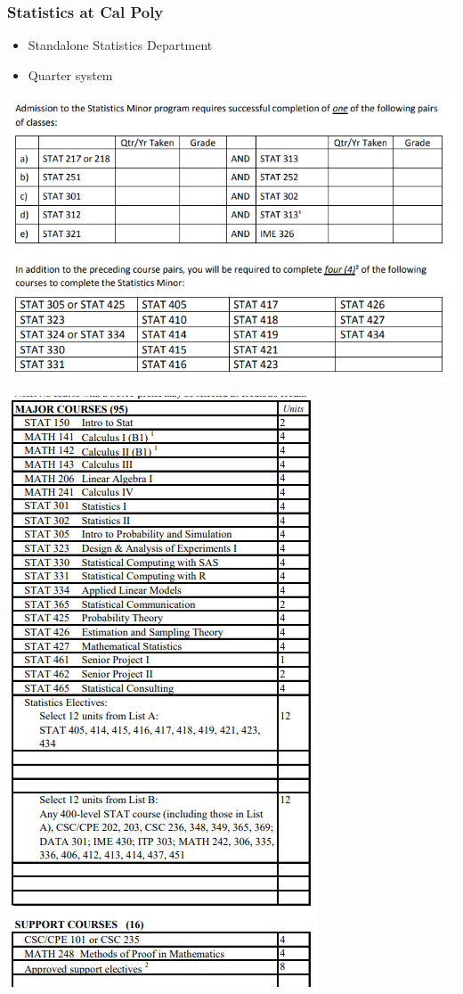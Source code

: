 \documentclass[xcolor={dvipsnames}]{beamer}
\newcommand{\bi}{\begin{itemize}}
\newcommand{\ei}{\end{itemize}}
\begin{document}
\begin{frame}
\frametitle{Statistics at Cal Poly}
\bi
	\item Standalone Statistics Department
	\item Quarter system
\ei
\begin{minipage}[t]{.45\linewidth}
	\vspace{-2.5in}
	\centering
	\includegraphics[width = \textwidth]{CP-STAT-minorform.PNG}
\end{minipage}
\begin{minipage}[t]{.45\linewidth}
	\centering
	\includegraphics[width = .65\textwidth]{CP-STAT-majorform.PNG}
\end{minipage}
\end{frame}
\end{document}
